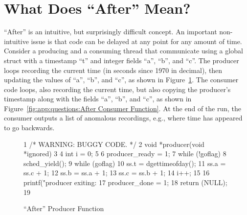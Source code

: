 
\section{What Does ``After'' Mean?}
\label{sec:app:questions:What Does ``After'' Mean?}

``After'' is an intuitive, but surprisingly difficult concept.
An important non-intuitive issue is that code can be delayed at
any point for any amount of time.
Consider a producing and a consuming thread that communicate using
a global struct with a timestamp ``t'' and integer fields ``a'', ``b'',
and ``c''.
The producer loops recording the current time
(in seconds since 1970 in decimal),
then updating the values of ``a'', ``b'', and ``c'',
as shown in Figure~\ref{fig:app:questions:After Producer Function}.
The consumer code loops, also recording the current time, but also
copying the producer's timestamp along with the fields ``a'',
``b'', and ``c'', as shown in
Figure~\ref{fig:app:questions:After Consumer Function}.
At the end of the run, the consumer outputs a list of anomalous recordings,
e.g., where time has appeared to go backwards.

\begin{figure}[htbp]
{ \scriptsize
\begin{verbbox}
  1 /* WARNING: BUGGY CODE. */
  2 void *producer(void *ignored)
  3 {
  4   int i = 0;
  5
  6   producer_ready = 1;
  7   while (!goflag)
  8     sched_yield();
  9   while (goflag) {
 10     ss.t = dgettimeofday();
 11     ss.a = ss.c + 1;
 12     ss.b = ss.a + 1;
 13     ss.c = ss.b + 1;
 14     i++;
 15   }
 16   printf("producer exiting: %
 17   producer_done = 1;
 18   return (NULL);
 19 }
\end{verbbox}
}
\centering
\theverbbox
\caption{``After'' Producer Function}
\label{fig:app:questions:After Producer Function}
\end{figure}


